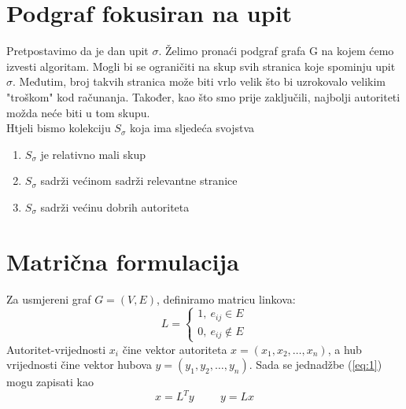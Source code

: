 \documentclass[11pt]{article}
\begin{document}
\section{Podgraf fokusiran na upit}
Pretpostavimo da je dan upit $\sigma$. Želimo pronaći podgraf grafa G na kojem ćemo izvesti algoritam. Mogli bi se ograničiti na skup svih stranica koje spominju upit $\sigma$. Međutim, broj takvih stranica može biti vrlo velik što bi uzrokovalo velikim "troškom" kod računanja. Također, kao što smo prije zaključili, najbolji autoriteti možda neće biti u tom skupu.\\
Htjeli bismo kolekciju $S_{\sigma}$ koja ima sljedeća svojstva
\begin{enumerate}
\item $S_{\sigma}$ je relativno mali skup
\item $S_{\sigma}$ sadrži većinom sadrži relevantne stranice
\item $S_{\sigma}$ sadrži većinu dobrih autoriteta
\end{enumerate}

\section{Matrična formulacija}
Za usmjereni graf $G=(V,E)$, definiramo matricu linkova:
$$L = \begin{cases}
1,~e_{ij}\in E\\
0,~e_{ij}\not\in E
\end{cases}$$
Autoritet-vrijednosti $x_{i}$ čine vektor autoriteta $x = (x_{1}, x_{2}, \dots, x_{n})$, a hub vrijednosti čine vektor hubova $y = (y_{1}, y_{2}, \dots, y_{n})$.
Sada se jednadžbe (\ref{eq:1}) mogu zapisati kao
\begin{equation}\label{eq:2}
x = L^{T}y\hspace{1cm}y = Lx
\end{equation}
\end{document}
